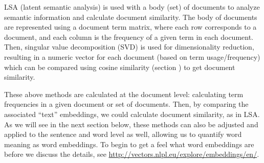 
LSA (latent semantic analysis) is used with a body (set) of documents to analyze semantic information and calculate document similarity. The body of documents are represented using a document term matrix, where each row corresponds to a document, and each column is the frequency of a given term in each document. Then, singular value decomposition (SVD) is used for dimensionality reduction, resulting in a numeric vector for each document (based on term usage/frequency) which can be compared using cosine similarity (section ) to get document similarity.

These above methods are calculated at the document level: calculating term frequencies in a given document or set of documents. Then, by comparing the associated ``text'' embeddings, we could calculate document similarity, as in LSA.
As we will see in the next section below, these methods can also be adjusted and applied to the sentence and word level as well, allowing us to quantify word meaning as word embeddings.
To begin to get a feel what word embeddings are before we discuss the details, see \url{http://vectors.nlpl.eu/explore/embeddings/en/}.





